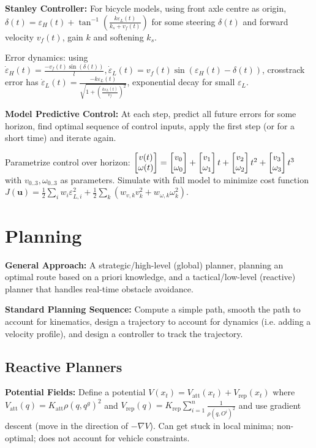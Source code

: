 \documentclass[twocolumn, 8pt]{extarticle}
\begin{document}
\textbf{Stanley Controller:} For bicycle models, using front axle centre as origin,
\(\displaystyle \delta(t) = \varepsilon _H(t) + \tan^{-1}\left(\frac{k\varepsilon _L(t)}{k_s + v_f(t)}\right)\)
for some steering \(\delta(t)\) and forward velocity \(v_f(t)\), gain \(k\) and softening \(k_s\).

Error dynamics: using \(\displaystyle \dot\varepsilon _H(t) = \frac{-v_f(t)\sin(\delta(t))}{l}, \dot\varepsilon _L(t) = v_f(t)\sin(\varepsilon _H(t) - \delta(t))\),
crosstrack error has \(\displaystyle \dot\varepsilon _L(t) = \frac{-k\varepsilon _L(t)}{\sqrt{1 + \left(\frac{k\varepsilon _L(t)}{v_f}\right)^2}}\),
exponential decay for small \(\varepsilon _L\).

\textbf{Model Predictive Control:} At each step, predict all future errors for some horizon, find optimal sequence of
control inputs, apply the first step (or for a short time) and iterate again.

Parametrize control over horizon: \(\cvec{v(t)}{\omega(t)} = \cvec{v_0}{\omega _0} + \cvec{v_1}{\omega _1}t + \cvec{v_2}{\omega _2}t^2 + \cvec{v_3}{\omega _3}t^3\)
with \(v_{0..3}, \omega _{0..3}\) as parameters. Simulate with full model to minimize cost function
\(\displaystyle J(\bm u) = \frac{1}{2}\sum _i w_i\varepsilon _{L,i}^2 + \frac{1}{2}\sum _k \left(w_{v,k}v_k^2 + w_{\omega,k}\omega _k^2\right)\).

\section{Planning} %

\textbf{General Approach:} A strategic/high-level (global) planner, planning an optimal route based on a priori
knowledge, and a tactical/low-level (reactive) planner that handles real-time obstacle avoidance.

\textbf{Standard Planning Sequence:} Compute a simple path, smooth the path to account for kinematics, design a
trajectory to account for dynamics (i.e. adding a velocity profile), and design a controller to track the trajectory.

\subsection{Reactive Planners}

\textbf{Potential Fields:} Define a potential \(V(x_t) = V_\text{att}(x_t) + V_\text{rep}(x_t)\) where
\(V_\text{att}(q) = K_\text{att}\rho(q, q^g)^2\) and \(\displaystyle V_\text{rep}(q) = K_\text{rep}\sum _{i = 1}^n \frac{1}{\rho(q, O^i)^2}\)
and use gradient descent (move in the direction of \(-\nabla V\)).
Can get stuck in local minima; non-optimal; does not account for vehicle constraints.
\end{document}
